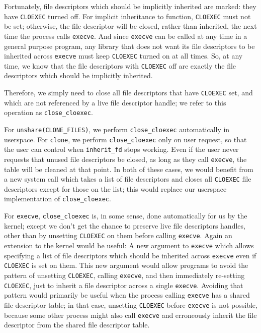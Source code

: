 \documentclass[letterpaper,twocolumn,10pt]{article}
\begin{document}
Fortunately, file descriptors which should be implicitly inherited are marked:
they have \texttt{CLOEXEC} turned off.
For implicit inheritance to function, \texttt{CLOEXEC} must not be set;
otherwise, the file descriptor will be closed, rather than inherited,
the next time the process calls \texttt{execve}.
And since \texttt{execve} can be called at any time in a general purpose program,
any library that does not want its file descriptors to be inherited across \texttt{execve}
must keep \texttt{CLOEXEC} turned on at all times.
So, at any time, we know that the file descriptors with \texttt{CLOEXEC} off
are exactly the file descriptors which should be implicitly inherited.

Therefore, we simply need to close all file descriptors that have \texttt{CLOEXEC} set,
and which are not referenced by a live file descriptor handle;
we refer to this operation as \verb|close_cloexec|.

For \texttt{unshare(CLONE\_FILES)}, we perform \texttt{close\_cloexec} automatically in userspace.
For \texttt{clone}, we perform \verb|close_cloexec| only on user request,
so that the user can control when \verb|inherit_fd| stops working.
Even if the user never requests that unused file descriptors be closed,
as long as they call \texttt{execve}, the table will be cleaned at that point.
In both of these cases,
we would benefit from a new system call which takes a list of file descriptors
and closes all \texttt{CLOEXEC} file descriptors except for those on the list;
this would replace our userspace implementation of \verb|close_cloexec|.

For \texttt{execve}, \verb|close_cloexec| is, in some sense, done automatically for us by the kernel;
except we don't get the chance to preserve live file descriptors handles,
other than by unsetting \texttt{CLOEXEC} on them before calling \texttt{execve}.
Again an extension to the kernel would be useful:
A new argument to \texttt{execve} which allows specifying a list of file descriptors
which should be inherited across \texttt{execve} even if \texttt{CLOEXEC} is set on them.
This new argument would allow programs to avoid the pattern
of unsetting \texttt{CLOEXEC}, calling \texttt{execve}, and then immediately re-setting \texttt{CLOEXEC},
just to inherit a file descriptor across a single \texttt{execve}.
Avoiding that pattern would primarily be useful
when the process calling \texttt{execve} has a shared file descriptor table;
in that case, unsetting \texttt{CLOEXEC} before \texttt{execve} is not possible,
because some other process might also call \texttt{execve}
and erroneously inherit the file descriptor from the shared file descriptor table.
\end{document}
